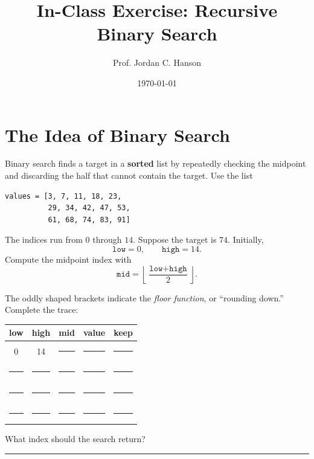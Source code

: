 \documentclass[11pt]{article}
\begin{document}
\twocolumn

\title{In-Class Exercise: Recursive Binary Search}
\author{Prof. Jordan C. Hanson}
\date{\today}

\maketitle

\section{The Idea of Binary Search}
Binary search finds a target in a \textbf{sorted} list by repeatedly checking the midpoint and discarding the half that cannot contain the target. Use the list
\begin{verbatim}
values = [3, 7, 11, 18, 23,
          29, 34, 42, 47, 53,
          61, 68, 74, 83, 91]
\end{verbatim}
The indices run from \(0\) through \(14\).  Suppose the target is \(74\). Initially,
\[
\texttt{low}=0,\qquad \texttt{high}=14.
\]
Compute the midpoint index with
\[
\texttt{mid}=\left\lfloor\frac{\texttt{low}+\texttt{high}}{2}\right\rfloor.
\]

The oddly shaped brackets indicate the \textit{floor function}, or ``rounding down.''  Complete the trace:
\begin{center}
\renewcommand{\arraystretch}{1.25}
\begin{tabular}{c|c|c|c|c}
\textbf{low} & \textbf{high} & \textbf{mid} & \textbf{value} & \textbf{keep}\\ \hline
0 & 14 & \rule{0.55cm}{0.15mm} & \rule{0.7cm}{0.15mm} & \rule{1.0cm}{0.15mm}\\
\rule{0.5cm}{0.15mm} & \rule{0.5cm}{0.15mm} & \rule{0.55cm}{0.15mm} & \rule{0.7cm}{0.15mm} & \rule{1.0cm}{0.15mm}\\
\rule{0.5cm}{0.15mm} & \rule{0.5cm}{0.15mm} & \rule{0.55cm}{0.15mm} & \rule{0.7cm}{0.15mm} & \rule{1.0cm}{0.15mm}\\
\rule{0.5cm}{0.15mm} & \rule{0.5cm}{0.15mm} & \rule{0.55cm}{0.15mm} & \rule{0.7cm}{0.15mm} & \rule{1.0cm}{0.15mm}\\
\end{tabular}
\end{center}

What index should the search return? \rule{1.2cm}{0.15mm}
\end{document}
